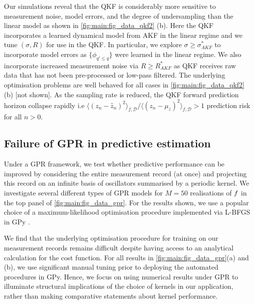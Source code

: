 Our simulations reveal that the QKF is considerably more sensitive to measurement noise, model errors, and the degree of undersampling than the linear model as shown in \cref{fig:main:fig_data_qkf2} (b). Here the QKF incorporates a learned dynamical model from AKF in the linear regime and we tune $(\sigma, R)$ for use in the QKF.  In particular, we explore $\sigma \geq \sigma_{AKF}^*$ to incorporate model errors as $\{\phi_{q' \leq q}\}$ were learned in the linear regime.  We also incorporate increased measurement noise via $R \geq R_{AKF}^*$ as QKF receives raw data that has not been pre-processed or low-pass filtered. The underlying optimisation problems are well behaved for all cases in \cref{fig:main:fig_data_qkf2}(b) [not shown].  As the sampling rate is reduced, the QKF forward prediction horizon collapse rapidly i.e $\langle (z_n - \hat{z}_n)^2 \rangle_{f, \mathcal{D}} / \langle (z_n - \mu_z)^2 \rangle_{f, \mathcal{D}} > 1 $ prediction risk for all $n>0$.  




\subsection{Failure of GPR in predictive estimation} 
Under a GPR framework, we test whether predictive performance can be improved by considering the entire measurement record (at once) and projecting this record on an infinite basis of oscillators summarised by a periodic kernel. We investigate several different types of GPR models for $M=50$ realisations of $f$ in the top panel of \cref{fig:main:fig_data_gpr}. For the results shown, we use a popular choice of a maximum-likelihood optimisation procedure implemented via L-BFGS in GPy \cite{gpy2014}.

We find that the underlying optimisation procedure for training on our measurement records remains difficult despite having access to an analytical calculation for the cost function. For all results in \cref{fig:main:fig_data_gpr}(a) and (b), we use significant manual tuning prior to deploying the automated procedures in GPy. Hence, we focus on using numerical results under GPR to illuminate structural implications of the choice of kernels in our application, rather than making comparative statements about kernel performance.

